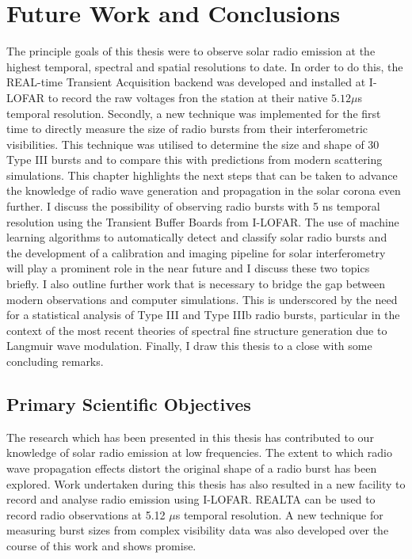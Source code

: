 \doublespacing
\chapter{Future Work and Conclusions}
\label{chap:future}
The principle goals of this thesis were to observe solar radio emission at the highest temporal, spectral and spatial resolutions to date. In order to do this, the REAL-time Transient Acquisition backend was developed and installed at I-LOFAR to record the raw voltages fron the station at their native $5.12 \mu$s temporal resolution.
Secondly, a new technique was implemented for the first time to directly measure the size of radio bursts from their interferometric visibilities. This technique was utilised to determine the size and shape of 30 Type III bursts and to compare this with predictions from modern scattering simulations.
This chapter highlights the next steps that can be taken to advance the knowledge of radio wave generation and propagation in the solar corona even further. I discuss the possibility of observing radio bursts with 5 ns temporal resolution using the Transient Buffer Boards from I-LOFAR. The use of machine learning algorithms to automatically detect and classify solar radio bursts and the development of a calibration and imaging pipeline for solar interferometry will play a prominent role in the near future and I discuss these two topics briefly. I also outline further work that is necessary to bridge the gap between modern observations and computer simulations. This is underscored by the need for a statistical analysis of Type III and Type IIIb radio bursts, particular in the context of the most recent theories of spectral fine structure generation due to Langmuir wave modulation. Finally, I draw this thesis to a close with some concluding remarks.

\section{Primary Scientific Objectives}
The research which has been presented in this thesis has contributed to our knowledge of solar radio emission at low frequencies. The extent to which radio wave propagation effects distort the original shape of a radio burst has been explored. Work undertaken during this thesis has also resulted in a new facility to record and analyse radio emission using I-LOFAR. REALTA can be used to record radio observations at 5.12 $\mu$s temporal resolution. A new technique for measuring burst sizes from complex visibility data was also developed over the course of this work and shows promise.

